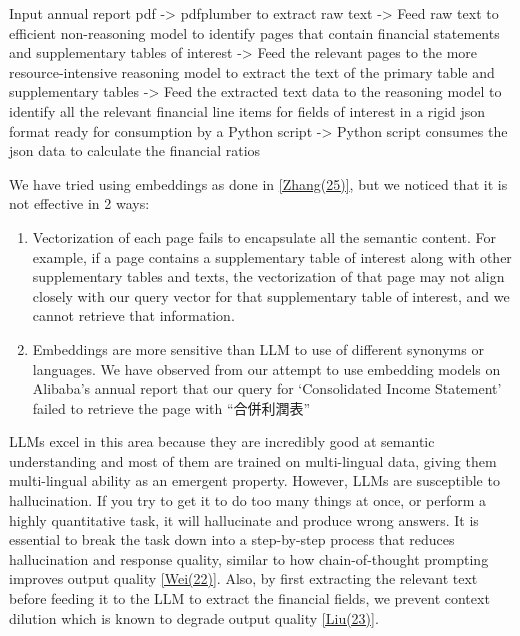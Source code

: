 \documentclass[12pt,a4paper]{article}
\begin{document}
Input annual report pdf -\textgreater{} pdfplumber to extract raw text
-\textgreater{} Feed raw text to efficient non-reasoning model to
identify pages that contain financial statements and supplementary
tables of interest -\textgreater{} Feed the relevant pages to the more
resource-intensive reasoning model to extract the text of the primary
table and supplementary tables -\textgreater{} Feed the extracted text
data to the reasoning model to identify all the relevant financial line
items for fields of interest in a rigid json format ready for
consumption by a Python script -\textgreater{} Python script consumes
the json data to calculate the financial ratios

We have tried using embeddings as done in \hyperlink{ref:zhang25}{[Zhang(25)]}, but we
noticed that it is not effective in 2 ways:

\begin{enumerate}
\def\labelenumi{\arabic{enumi}.}
\item
  Vectorization of each page fails to encapsulate all the semantic
  content. For example, if a page contains a supplementary table of
  interest along with other supplementary tables and texts, the
  vectorization of that page may not align closely with our query vector
  for that supplementary table of interest, and we cannot retrieve that
  information.
\item
  Embeddings are more sensitive than LLM to use of different synonyms or
  languages. We have observed from our attempt to use embedding models
  on Alibaba's annual report that our query for `Consolidated Income
  Statement' failed to retrieve the page with ``合併利潤表''
\end{enumerate}

LLMs excel in this area because they are incredibly good at semantic
understanding and most of them are trained on multi-lingual data, giving
them multi-lingual ability as an emergent property. However, LLMs are
susceptible to hallucination. If you try to get it to do too many things
at once, or perform a highly quantitative task, it will hallucinate and
produce wrong answers. It is essential to break the task down into a
step-by-step process that reduces hallucination and response quality,
similar to how chain-of-thought prompting improves output quality
\hyperlink{ref:wei22}{[Wei(22)]}. Also, by first extracting the relevant text before
feeding it to the LLM to extract the financial fields, we prevent
context dilution which is known to degrade output quality \hyperlink{ref:liu23}{[Liu(23)]}.
\end{document}
